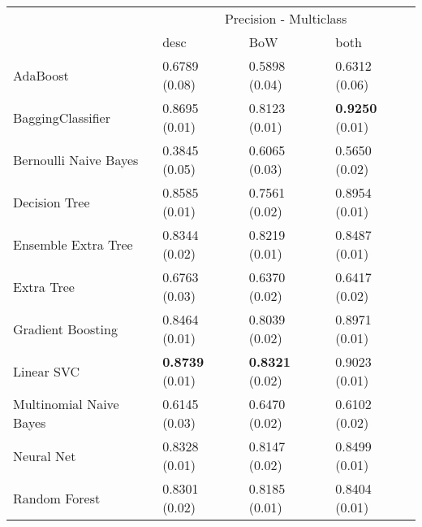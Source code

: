 \begin{tabular}{|l|l|l|l| }
\hline
 &  \multicolumn{3}{c|}{ Precision - Multiclass} \\
\cline{2-4} & desc & BoW & both \\ \hline
AdaBoost                & 0.6789 (0.08) & 0.5898 (0.04) & 0.6312 (0.06)\\
BaggingClassifier       & 0.8695 (0.01) & 0.8123 (0.01) & {\bf 0.9250} (0.01)\\
Bernoulli Naive Bayes   & 0.3845 (0.05) & 0.6065 (0.03) & 0.5650 (0.02)\\
Decision Tree           & 0.8585 (0.01) & 0.7561 (0.02) & 0.8954 (0.01)\\
Ensemble Extra Tree     & 0.8344 (0.02) & 0.8219 (0.01) & 0.8487 (0.01)\\
Extra Tree              & 0.6763 (0.03) & 0.6370 (0.02) & 0.6417 (0.02)\\
Gradient Boosting       & 0.8464 (0.01) & 0.8039 (0.02) & 0.8971 (0.01)\\
Linear SVC              & {\bf 0.8739} (0.01) & {\bf 0.8321} (0.02) & 0.9023 (0.01)\\
Multinomial Naive Bayes & 0.6145 (0.03) & 0.6470 (0.02) & 0.6102 (0.02)\\
Neural Net              & 0.8328 (0.01) & 0.8147 (0.02) & 0.8499 (0.01)\\
Random Forest           & 0.8301 (0.02) & 0.8185 (0.01) & 0.8404 (0.01)\\
\hline
\end{tabular}